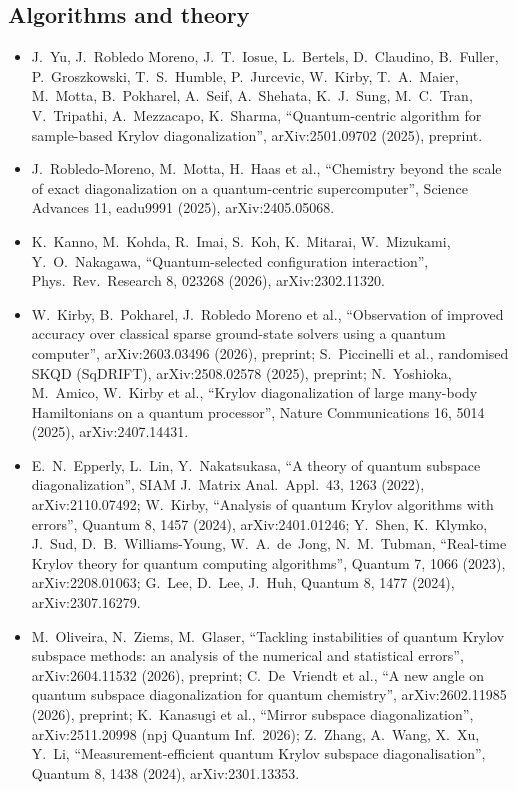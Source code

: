 \documentclass[11pt,a4paper]{article}
\begin{document}
\subsection*{Algorithms and theory}
\begin{itemize}\small\sloppy
\item J.~Yu, J.~Robledo Moreno, J.~T.~Iosue, L.~Bertels, D.~Claudino, B.~Fuller, P.~Groszkowski, T.~S.~Humble, P.~Jurcevic, W.~Kirby, T.~A.~Maier, M.~Motta, B.~Pokharel, A.~Seif, A.~Shehata, K.~J.~Sung, M.~C.~Tran, V.~Tripathi, A.~Mezzacapo, K.~Sharma, ``Quantum-centric algorithm for sample-based Krylov diagonalization'', arXiv:2501.09702 (2025), preprint.
\item J.~Robledo-Moreno, M.~Motta, H.~Haas et al., ``Chemistry beyond the scale of exact diagonalization on a quantum-centric supercomputer'', Science Advances 11, eadu9991 (2025), arXiv:2405.05068.
\item K.~Kanno, M.~Kohda, R.~Imai, S.~Koh, K.~Mitarai, W.~Mizukami, Y.~O.~Nakagawa, ``Quantum-selected configuration interaction'', Phys.\ Rev.\ Research 8, 023268 (2026), arXiv:2302.11320.
\item W.~Kirby, B.~Pokharel, J.~Robledo Moreno et al., ``Observation of improved accuracy over classical sparse ground-state solvers using a quantum computer'', arXiv:2603.03496 (2026), preprint; S.~Piccinelli et al., randomised SKQD (SqDRIFT), arXiv:2508.02578 (2025), preprint; N.~Yoshioka, M.~Amico, W.~Kirby et al., ``Krylov diagonalization of large many-body Hamiltonians on a quantum processor'', Nature Communications 16, 5014 (2025), arXiv:2407.14431.
\item E.~N.~Epperly, L.~Lin, Y.~Nakatsukasa, ``A theory of quantum subspace diagonalization'', SIAM J.\ Matrix Anal.\ Appl.\ 43, 1263 (2022), arXiv:2110.07492; W.~Kirby, ``Analysis of quantum Krylov algorithms with errors'', Quantum 8, 1457 (2024), arXiv:2401.01246; Y.~Shen, K.~Klymko, J.~Sud, D.~B.~Williams-Young, W.~A.~de~Jong, N.~M.~Tubman, ``Real-time Krylov theory for quantum computing algorithms'', Quantum 7, 1066 (2023), arXiv:2208.01063; G.~Lee, D.~Lee, J.~Huh, Quantum 8, 1477 (2024), arXiv:2307.16279.
\item M.~Oliveira, N.~Ziems, M.~Glaser, ``Tackling instabilities of quantum Krylov subspace methods: an analysis of the numerical and statistical errors'', arXiv:2604.11532 (2026), preprint; C.~De~Vriendt et al., ``A new angle on quantum subspace diagonalization for quantum chemistry'', arXiv:2602.11985 (2026), preprint; K.~Kanasugi et al., ``Mirror subspace diagonalization'', arXiv:2511.20998 (npj Quantum Inf.\ 2026); Z.~Zhang, A.~Wang, X.~Xu, Y.~Li, ``Measurement-efficient quantum Krylov subspace diagonalisation'', Quantum 8, 1438 (2024), arXiv:2301.13353.

\end{itemize}
\end{document}
